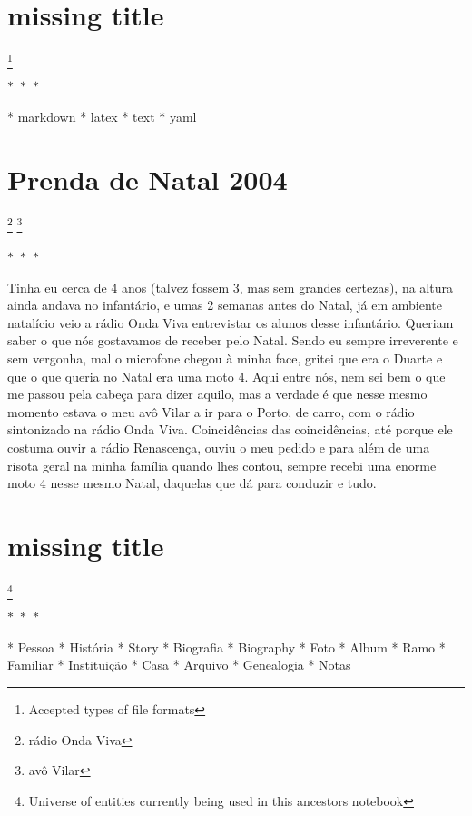 \documentclass{article}
\begin{document}
\section{missing title}
\footnote{Accepted types of file formats}
   
    \begin{center}
        $\ast$~$\ast$~$\ast$
    \end{center}
    

* markdown
* latex
* text
* yaml

    	
\pagebreak\section{Prenda de Natal 2004}
\footnote{rádio Onda Viva}
\footnote{avô Vilar}
   
    \begin{center}
        $\ast$~$\ast$~$\ast$
    \end{center}
    


Tinha eu cerca de 4 anos (talvez fossem 3, mas sem grandes certezas), na
altura ainda andava no infantário, e umas 2 semanas antes do Natal, já
em ambiente natalício veio a rádio Onda Viva entrevistar os alunos desse
infantário. Queriam saber o que nós gostavamos de receber pelo Natal.
Sendo eu sempre irreverente e sem vergonha, mal o microfone chegou à
minha face, gritei que era o Duarte e que o que queria no Natal era uma
moto 4. Aqui entre nós, nem sei bem o que me passou pela cabeça para
dizer aquilo, mas a verdade é que nesse mesmo momento estava o meu avô
Vilar a ir para o Porto, de carro, com o rádio sintonizado na rádio Onda
Viva. Coincidências das coincidências, até porque ele costuma ouvir a
rádio Renascença, ouviu o meu pedido e para além de uma risota geral na
minha família quando lhes contou, sempre recebi uma enorme moto 4 nesse
mesmo Natal, daquelas que dá para conduzir e tudo.

    	
\pagebreak\section{missing title}
\footnote{Universe of entities currently being used in this ancestors notebook}
   
    \begin{center}
        $\ast$~$\ast$~$\ast$
    \end{center}
    

* Pessoa
* História
* Story
* Biografia
* Biography
* Foto
* Album
* Ramo
* Familiar
* Instituição
* Casa
* Arquivo
* Genealogia
* Notas

    	
\pagebreak
\end{document}
